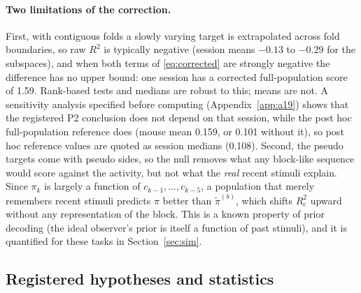 \documentclass{article}
\begin{document}
\paragraph{Two limitations of the correction.} First, with contiguous folds a slowly varying target is extrapolated
across fold boundaries, so raw $R^2$ is typically negative (session means $-0.13$ to $-0.29$ for the subspaces), and
when both terms of \eqref{eq:corrected} are strongly negative the difference has no upper bound: one session has a
corrected full-population score of 1.59. Rank-based tests and medians are robust to this; means are not. A
sensitivity analysis specified before computing (Appendix~\ref{app:a19}) shows that the registered P2 conclusion does
not depend on that session, while the post hoc full-population reference does (mouse mean 0.159, or 0.101 without it),
so post hoc reference values are quoted as session medians (0.108). Second, the pseudo targets come with pseudo sides, so the null removes what any block-like sequence
would score against the activity, but not what the \emph{real} recent stimuli explain. Since $\pi_k$ is largely a
function of $c_{k-1},\dots,c_{k-5}$, a population that merely remembers recent stimuli predicts $\pi$ better than
$\tilde\pi^{(b)}$, which shifts $R^2_{\mathrm c}$ upward without any representation of the block. This is a known
property of prior decoding (the ideal observer's prior is itself a function of past stimuli), and it is
quantified for these tasks in Section~\ref{sec:sim}.

\subsection{Registered hypotheses and statistics}
\label{sec:prereg}
\end{document}
